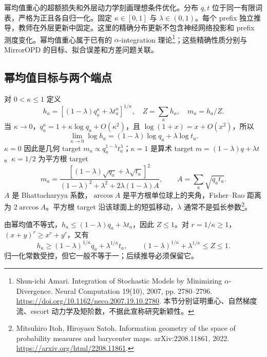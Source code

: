 幂均值重心的超额损失和外层动力学刻画理想条件优化。分布 $q,t$ 位于同一有限词表，严格为正且各自归一化。固定 $\kappa\in[0,1]$ 与 $\lambda\in(0,1)$。每个 prefix 独立推导，教师在外层更新中固定。这里的精确分布更新不包含神经网络投影和 prefix 测度变化。幂均值重心属于已有的 $\alpha$-integration 理论\footnote{Shun-ichi Amari. Integration of Stochastic Models by Minimizing $\alpha$-Divergence. Neural Computation 19(10), 2007, pp. 2780--2796. \url{https://doi.org/10.1162/neco.2007.19.10.2780}. 本节分别证明重心、自然梯度流、escort 动力学及矩阶数，不据此宣称研究新颖性。}；这些精确性质分别与 MirrorOPD 的目标、拟合误差和方差问题关联。

\subsection{幂均值目标与两个端点}

对 $0<\kappa\le1$ 定义
\begin{equation}
 h_a=[(1-\lambda)q_a^\kappa+\lambda t_a^\kappa]^{1/\kappa},\quad
 Z=\sum_ah_a,\quad m_a=h_a/Z.
 \label{eq:proximal-power-target}
\end{equation}
当 $\kappa\to0$，$q_a^\kappa=1+\kappa\log q_a+O(\kappa^2)$，且 $\log(1+x)=x+O(x^2)$，所以
\begin{equation}
 \lim_{\kappa\to0}\log h_a=(1-\lambda)\log q_a+\lambda\log t_a.
\end{equation}
$\kappa=0$ 因此是几何 target $m_a\propto q_a^{1-\lambda}t_a^\lambda$；$\kappa=1$ 是算术 target $m=(1-\lambda)q+\lambda t$。$\kappa=1/2$ 为平方根 target
\begin{equation}
 m_a=\frac{[(1-\lambda)\sqrt{q_a}+\lambda\sqrt{t_a}]^2}
 {(1-\lambda)^2+\lambda^2+2\lambda(1-\lambda)A},\qquad
 A=\sum_a\sqrt{q_at_a}.
 \label{eq:proximal-square-root}
\end{equation}
$A$ 是 Bhattacharyya 系数，$\arccos A$ 是平方根单位球上的夹角，Fisher--Rao 距离为 $2\arccos A$。平方根 target 沿该球面上的短弧移动，$\lambda$ 通常不是弧长参数\footnote{Mitsuhiro Itoh, Hiroyasu Satoh. Information geometry of the space of probability measures and barycenter maps. arXiv:2208.11861, 2022. \url{https://arxiv.org/html/2208.11861}.}。

由幂均值不等式，$h_a\le(1-\lambda)q_a+\lambda t_a$，因此 $Z\le1$。对 $r=1/\kappa\ge1$，$(x+y)^r\ge x^r+y^r$，又有
\begin{equation}
 h_a\ge(1-\lambda)^{1/\kappa}q_a+\lambda^{1/\kappa}t_a,
 \qquad
 (1-\lambda)^{1/\kappa}+\lambda^{1/\kappa}\le Z\le1.
\end{equation}
归一化常数受控，但它一般不等于一；后续推导必须保留它。

